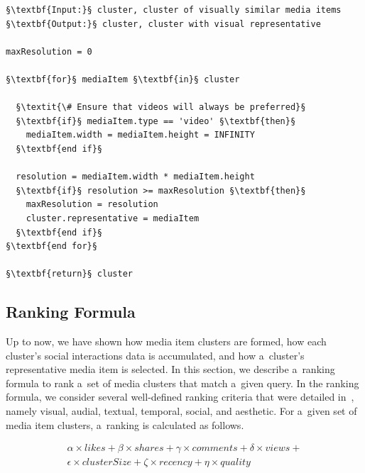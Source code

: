\begin{lstlisting}[caption={[Pseudocode of the cluster visual representative selection algorithm]{Pseudocode of the cluster visual representative selection algorithm that finds the highest quality media item of a~cluster}},
  label=code:clusterrepresentative, float, escapechar=§]
§\textbf{Input:}§ cluster, cluster of visually similar media items
§\textbf{Output:}§ cluster, cluster with visual representative
  
maxResolution = 0

§\textbf{for}§ mediaItem §\textbf{in}§ cluster
  
  §\textit{\# Ensure that videos will always be preferred}§  
  §\textbf{if}§ mediaItem.type == 'video' §\textbf{then}§
    mediaItem.width = mediaItem.height = INFINITY
  §\textbf{end if}§ 
    
  resolution = mediaItem.width * mediaItem.height
  §\textbf{if}§ resolution >= maxResolution §\textbf{then}§
    maxResolution = resolution
    cluster.representative = mediaItem
  §\textbf{end if}§  
§\textbf{end for}§

§\textbf{return}§ cluster     
\end{lstlisting}

\subsection{Ranking Formula}
\label{sec:introduction-of-a-ranking-formula}

Up to now, we have shown how media item clusters are formed,
how each cluster's social interactions data is accumulated,
and how a~cluster's representative media item is selected.
In this section, we describe a~ranking formula to rank
a~set of media clusters that match a~given query.
In the ranking formula, we consider several well-defined ranking criteria
that were detailed in~\cite{steiner2012definingaesthetic},
namely visual, audial, textual, temporal, social, and aesthetic.
For a~given set of media item clusters, a~ranking is calculated as follows.

\begin{gather}\label{eq:rankingformula}
  \alpha \times \mathit{likes} + \beta \times \mathit{shares} +
  \gamma \times \mathit{comments} + \delta \times \mathit{views} + \nonumber\\
  \epsilon \times \mathit{clusterSize} + \zeta \times \mathit{recency} +
  \eta \times \mathit{quality}
\end{gather}

